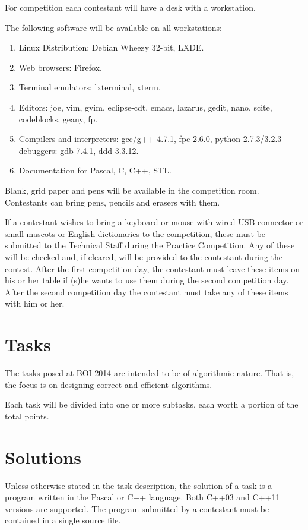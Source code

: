 \documentclass[a5paper,10pt,twoside]{book}
\begin{document}
For competition each contestant will have a desk with a workstation.

The following software will be available on all workstations:

\begin{enumerate}
    \item Linux Distribution: Debian Wheezy 32-bit, LXDE.
    \item Web browsers: Firefox.
    \item Terminal emulators: lxterminal, xterm.
    \item Editors: joe, vim, gvim, eclipse-cdt, emacs, lazarus, gedit, nano,
    scite, codeblocks, geany, fp.
    \item Compilers and interpreters: gcc/g++ 4.7.1, fpc 2.6.0, python
    2.7.3/3.2.3 debuggers: gdb 7.4.1, ddd 3.3.12.
    \item Documentation for Pascal, C, C++, STL.
\end{enumerate}

Blank, grid paper and pens will be available in the competition room.
Contestants can bring pens, pencils and erasers with them.

If a contestant wishes to bring a keyboard or mouse with wired USB connector or
small mascots or English dictionaries to the competition, these must be
submitted to the Technical Staff during the Practice Competition. Any of these
will be checked and, if cleared, will be provided to the contestant during the
contest. After the first competition day, the contestant must leave these items
on his or her table if (s)he wants to use them during the second competition
day. After the second competition day the contestant must take any of these
items with him or her.

\section{Tasks}

The tasks posed at BOI 2014 are intended to be of algorithmic nature. That is,
the focus is on designing correct and efficient algorithms.

Each task will be divided into one or more subtasks, each worth a portion of the
total points.

\section{Solutions}

Unless otherwise stated in the task description, the solution of a task is a
program written in the Pascal or C++ language. Both C++03 and C++11 versions are
supported. The program submitted by a contestant must be contained in a single
source file.
\end{document}
